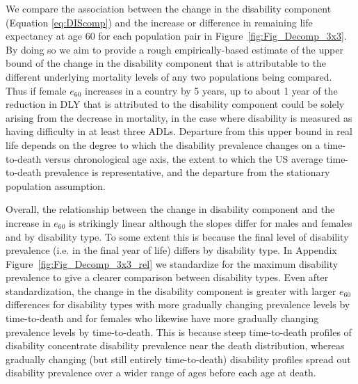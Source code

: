 \documentclass[11pt,oneside,a4paper]{article} %
\begin{document}
We compare the association between the change in the disability component
(Equation \ref{eq:DIScomp}) and the increase or difference in remaining life
expectancy at age 60 for each population pair in
Figure~\ref{fig:Fig_Decomp_3x3}. By doing so we aim to provide a rough
empirically-based estimate of the upper bound of the change in the disability
component that is attributable to the different underlying mortality levels
of any two populations being compared. Thus if female $e_{60}$ increases in a
country by 5 years, up to about 1 year of the reduction in DLY that is
attributed to the disability component could be solely arising from the decrease
in mortality, in the case where disability is measured as having difficulty in
at least three ADLs. Departure from this upper bound in real life depends on
the degree to which the disability prevalence changes on a time-to-death versus chronological
age axis, the extent to which the US average time-to-death prevalence is
representative, and the departure from the stationary population assumption.

Overall, the relationship between the change in disability component and the
increase in $e_{60}$ is strikingly linear although the slopes differ for males
and females and by disability type. To some extent this is because the
final level of disability prevalence (i.e. in the final year of life) differs by
disability type.
In Appendix Figure~\ref{fig:Fig_Decomp_3x3_rel} we standardize for the maximum
disability prevalence to give a clearer comparison between disability types.
Even after standardization, the change in the disability component is
greater with larger $e_{60}$ differences for disability types with more
gradually changing prevalence levels by time-to-death and for females who
likewise have more gradually changing prevalence levels by time-to-death.
This is because steep time-to-death profiles of disability concentrate
disability prevalence near the death distribution,
whereas gradually changing (but still entirely time-to-death) disability
profiles spread out disability prevalence over a wider range of ages before
each age at death.
\end{document}
